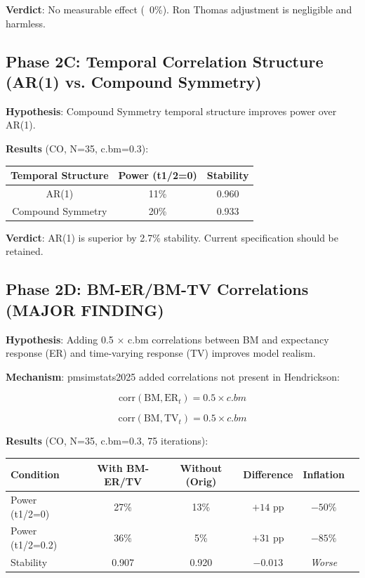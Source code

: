 \documentclass[12pt,a4paper]{article}
\begin{document}
\textbf{Verdict}: No measurable effect (~0\%). Ron Thomas adjustment is negligible and harmless.

\subsection{Phase 2C: Temporal Correlation Structure (AR(1) vs. Compound Symmetry)}

\textbf{Hypothesis}: Compound Symmetry temporal structure improves power over AR(1).

\textbf{Results} (CO, N=35, c.bm=0.3):

\begin{center}
\begin{tabular}{ccc}
\toprule
\textbf{Temporal Structure} & \textbf{Power (t1/2=0)} & \textbf{Stability} \\
\midrule
AR(1) & 11\% & 0.960 \\
Compound Symmetry & 20\% & 0.933 \\
\bottomrule
\end{tabular}
\end{center}

\textbf{Verdict}: AR(1) is superior by 2.7\% stability. Current specification should be retained.

\subsection{Phase 2D: BM-ER/BM-TV Correlations (MAJOR FINDING)}

\textbf{Hypothesis}: Adding 0.5 $\times$ c.bm correlations between BM and expectancy response (ER) and time-varying response (TV) improves model realism.

\textbf{Mechanism}: pmsimstats2025 added correlations not present in Hendrickson:

\begin{equation}
\text{corr}(\text{BM}, \text{ER}_t) = 0.5 \times c.bm
\end{equation}

\begin{equation}
\text{corr}(\text{BM}, \text{TV}_t) = 0.5 \times c.bm
\end{equation}

\textbf{Results} (CO, N=35, c.bm=0.3, 75 iterations):

\begin{center}
\begin{tabular}{lccccc}
\toprule
\textbf{Condition} & \textbf{With BM-ER/TV} & \textbf{Without (Orig)} & \textbf{Difference} & \textbf{Inflation} \\
\midrule
Power (t1/2=0) & 27\% & 13\% & $+14$ pp & $-50\%$ \\
Power (t1/2=0.2) & 36\% & 5\% & $+31$ pp & $-85\%$ \\
Stability & 0.907 & 0.920 & $-0.013$ & \textit{Worse} \\
\bottomrule
\end{tabular}
\end{center}
\end{document}
